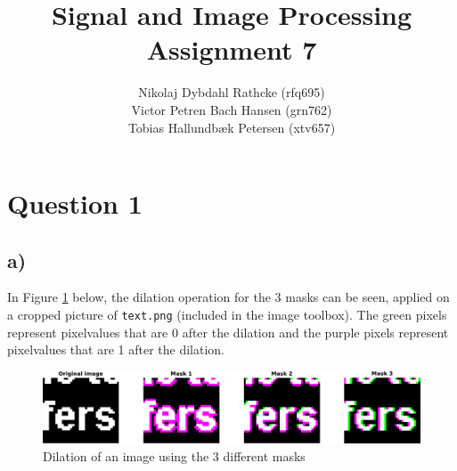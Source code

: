 \documentclass[a4paper]{article}
\author{Nikolaj Dybdahl Rathcke (rfq695) \\
        Victor Petren Bach Hansen (grn762) \\
        Tobias Hallundbæk Petersen (xtv657) }
\title{Signal and Image Processing \\ Assignment 7}
\begin{document}
\maketitle

\section*{Question 1}
\subsection*{a)}
In Figure \ref{fig:q1a} below, the dilation operation for the 3 masks can be seen, applied on a cropped picture of \texttt{text.png} (included in the image toolbox). The green pixels represent pixelvalues that are 0 after the dilation and the purple pixels represent pixelvalues that are 1 after the dilation.
\begin{figure}[H]
\begin{center}
  \includegraphics[scale=0.5]{q1a-crop.pdf}
\end{center}
\caption{Dilation of an image using the 3 different masks}
\label{fig:q1a}
\end{figure}
\end{document}
